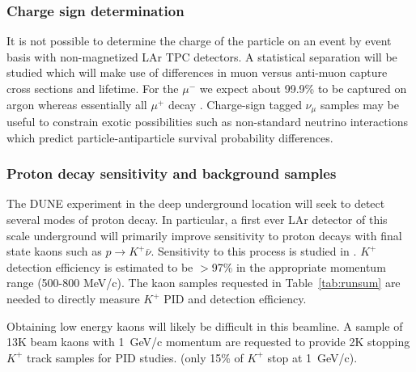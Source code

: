 \subsubsection{Charge sign determination}

It is not possible to determine the charge of the particle on an event by event basis with non-magnetized LAr TPC detectors. A statistical separation will be studied which will make use of differences in muon versus anti-muon capture cross sections and lifetime.
For the $\mu^-$ we expect about 99.9\% to be captured on argon whereas essentially all $\mu^+$ decay \cite{stopmu}.
Charge-sign tagged $\nu_\mu$ samples may be useful to constrain exotic possibilities such as
non-standard neutrino interactions which predict particle-antiparticle survival probability differences. 


\subsubsection{Proton decay sensitivity and background samples}


The DUNE experiment in the deep underground location will seek to detect several modes of proton decay.
In particular, a first ever LAr detector of this scale underground will primarily improve sensitivity to 
proton decays with final state kaons such as  $p \rightarrow K^+ \overline{\nu}$. 
Sensitivity to this process is studied in \cite{bueno}. $K^+$ detection efficiency is estimated to be $>$97\% in the
appropriate momentum range (500-800 MeV/c). The kaon samples requested in Table~\ref{tab:runsum} are needed to directly measure 
$K^+$ PID and detection efficiency. 

Obtaining low energy kaons will likely be difficult in this beamline.
A sample of 13K beam kaons with 1~GeV/c momentum are requested to provide 2K stopping $K^+$ track samples for PID studies.
(only 15\% of $K^+$ stop at 1~GeV/c).



